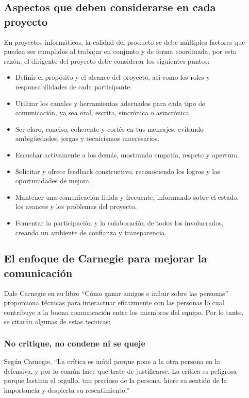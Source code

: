 \documentclass[journal]{IEEEtran}
\begin{document}
\subsection{Aspectos que deben considerarse en cada proyecto}
En proyectos informáticos, la calidad del producto se debe múltiples factores que pueden ser cumplidos al trabajar en conjunto y de forma coordinada, por esta razón, el dirigente del proyecto debe considerar los siguientes puntos:
\begin{itemize}
	\item Definir el propósito y el alcance del proyecto, así como los roles y responsabilidades de cada participante.
	\item Utilizar los canales y herramientas adecuados para cada tipo de comunicación, ya sea oral, escrita, sincrónica o asincrónica.
	\item Ser claro, conciso, coherente y cortés en tus mensajes, evitando ambigüedades, jergas y tecnicismos innecesarios.
	\item Escuchar activamente a los demás, mostrando empatía, respeto y apertura.
	\item Solicitar y ofrece feedback constructivo, reconociendo los logros y las oportunidades de mejora.
	\item Mantener una comunicación fluida y frecuente, informando sobre el estado, los avances y los problemas del proyecto.
	\item Fomentar la participación y la colaboración de todos los involucrados, creando un ambiente de confianza y transparencia.
\end{itemize}

\subsection{El enfoque de Carnegie para mejorar la comunicación}
Dale Carnegie en su libro “Cómo ganar amigos e influir sobre las personas” proporciona técnicas para interactuar eficazmente con las personas lo cual contribuye a la buena comunicación entre los miembros del equipo. Por lo tanto, se citarán algunas de estas tecnicas:

\subsubsection{No critique, no condene ni se queje}
Según Carnegie, “La crítica es inútil porque pone a la otra persona en la defensiva, y por lo común hace que trate de justificarse. La crítica es peligrosa porque lastima el orgullo, tan precioso de la persona, hiere su sentido de la importancia y despierta su resentimiento.”
\end{document}
